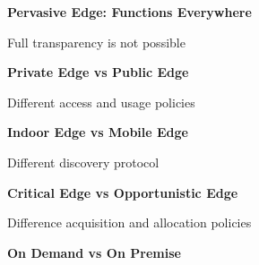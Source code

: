 \textbf{Pervasive Edge: Functions Everywhere}

Full transparency is not possible

\textbf{Private Edge vs Public Edge}

Different access and usage policies

\textbf{Indoor Edge vs Mobile Edge}

Different discovery protocol

\textbf{Critical Edge vs Opportunistic Edge}

Difference acquisition and allocation policies


\textbf{On Demand vs On Premise}